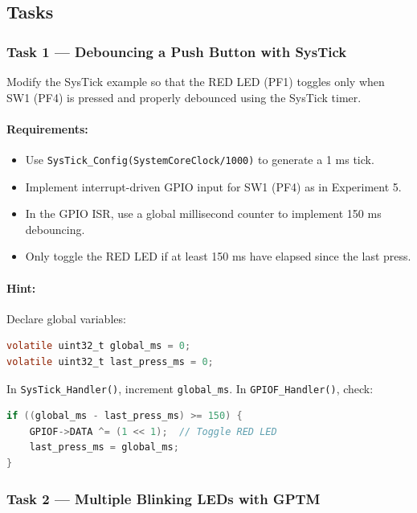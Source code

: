 \newpage
\subsection{Tasks}

\subsubsection{Task 1 — Debouncing a Push Button with SysTick}

Modify the SysTick example so that the RED LED (PF1) toggles only when SW1 (PF4) is pressed and properly debounced using the SysTick timer.

\paragraph{Requirements:}
\begin{itemize}[nosep]
  \item Use \texttt{SysTick\_Config(SystemCoreClock/1000)} to generate a 1 ms tick.
  \item Implement interrupt-driven GPIO input for SW1 (PF4) as in Experiment 5.
  \item In the GPIO ISR, use a global millisecond counter to implement 150 ms debouncing.
  \item Only toggle the RED LED if at least 150 ms have elapsed since the last press.
\end{itemize}

\paragraph{Hint:}
Declare global variables:
\begin{lstlisting}[language=C]
volatile uint32_t global_ms = 0;
volatile uint32_t last_press_ms = 0;
\end{lstlisting}

\noindent
In \texttt{SysTick\_Handler()}, increment \texttt{global\_ms}. In \texttt{GPIOF\_Handler()}, check:
\begin{lstlisting}[language=C]
if ((global_ms - last_press_ms) >= 150) {
    GPIOF->DATA ^= (1 << 1);  // Toggle RED LED
    last_press_ms = global_ms;
}
\end{lstlisting}

\subsubsection{Task 2 — Multiple Blinking LEDs with GPTM}

